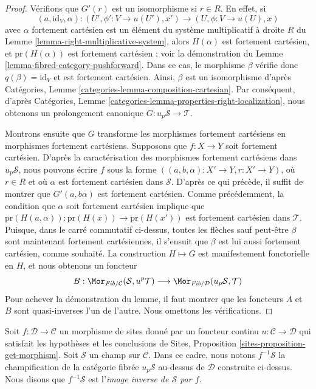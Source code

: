 \begin{proof}
\medskip\noindent
Vérifions que $G'(r)$ est un isomorphisme si $r \in R$.
En effet, si
$$
(a, \text{id}_V, \alpha) :
(U', \phi' : V \to u(U'), x')
\longrightarrow
(U, \phi : V \to u(U), x)
$$
avec $\alpha$ fortement cartésien est un élément du système multiplicatif à
droite $R$ du
Lemme \ref{lemma-right-multiplicative-system},
alors $H(\alpha)$ est fortement cartésien, et
$\text{pr}(H(\alpha))$ est fortement cartésien ; voir la démonstration du
Lemme \ref{lemma-fibred-category-pushforward}.
Dans ce cas, le morphisme $\beta$ vérifie donc $q(\beta) = \text{id}_V$
et est fortement cartésien. Ainsi, $\beta$ est un isomorphisme d'après
Catégories, Lemme \ref{categories-lemma-composition-cartesian}.
Par conséquent, d'après
Catégories, Lemme \ref{categories-lemma-properties-right-localization},
nous obtenons un prolongement canonique $G : u_p\mathcal{S} \to \mathcal{T}$.

\medskip\noindent
Montrons ensuite que $G$ transforme les morphismes fortement cartésiens
en morphismes fortement cartésiens.
Supposons que $f : X \to Y$ soit fortement cartésien. D'après la caractérisation
des morphismes fortement cartésiens dans $u_p\mathcal{S}$, nous pouvons écrire $f$ sous la forme
$((a, b, \alpha) : X' \to Y, r : X' \to Y)$, où $r \in R$ et où
$\alpha$ est fortement cartésien dans $\mathcal{S}$. D'après ce qui précède, il suffit
de montrer que $G'(a, b \alpha)$ est fortement cartésien. Comme précédemment,
la condition que $\alpha$ soit fortement cartésien implique que
$\text{pr}(H(a, \alpha)) : \text{pr}(H(x)) \to \text{pr}(H(x'))$
est fortement cartésien dans $\mathcal{T}$. Puisque, dans le carré commutatif
ci-dessus, toutes les flèches sauf peut-être $\beta$ sont maintenant fortement cartésiennes,
il s'ensuit que $\beta$ est lui aussi fortement cartésien, comme souhaité.
La construction $H \mapsto G$ est manifestement fonctorielle en $H$, et nous
obtenons un foncteur
$$
B :
\Mor_{\textit{Fib}/\mathcal{C}}(\mathcal{S}, u^p\mathcal{T})
\longrightarrow
\Mor_{\textit{Fib}/\mathcal{D}}(u_p\mathcal{S}, \mathcal{T})
$$
Pour achever la démonstration du lemme, il faut montrer que les foncteurs
$A$ et $B$ sont quasi-inverses l'un de l'autre. Nous omettons les vérifications.
\end{proof}

\begin{definition}
\label{definition-pullback-stack}
Soit $f : \mathcal{D} \to \mathcal{C}$ un morphisme de sites
donné par un foncteur continu $u : \mathcal{C} \to \mathcal{D}$
qui satisfait les hypothèses et les conclusions de
Sites, Proposition \ref{sites-proposition-get-morphism}.
Soit $\mathcal{S}$ un champ sur $\mathcal{C}$.
Dans ce cadre, nous notons {\it $f^{-1}\mathcal{S}$} la champification
de la catégorie fibrée $u_p\mathcal{S}$ au-dessus de $\mathcal{D}$ construite
ci-dessus. Nous disons que $f^{-1}\mathcal{S}$ est
l'{\it image inverse de $\mathcal{S}$ par $f$}.
\end{definition}

